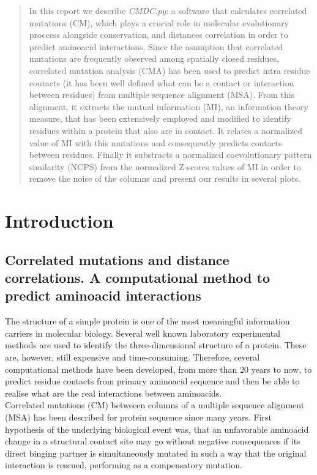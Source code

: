 \documentclass[12pt]{article}
\begin{document}
\maketitle

\begin{abstract}
In this report we describe \textit{CMDC.py}: a software that calculates correlated mutations (CM), which plays a crucial role in molecular evolutionary proccess alongside conservation, and distances correlation in order to predict aminoacid interactions. Since the asumption that correlated mutations are frequently observed among spatially closed residues, correlated mutation analysis (CMA) has been used to predict intra residue contacts (it has been well defined what can be a contact or interaction between residues) from multiple sequence alignment (MSA). From this alignment, it extracts the mutual information (MI), an information theory measure, that has been extensively employed and modified to identify residues within a protein that also are in contact. It relates a normalized value of MI with this mutations and consequently predicts contacts between residues. Finally it substracts a normalized coevolutionary pattern similarity (NCPS) from the normalized Z-scores values of MI in order to remove the noise of the columns and present our results in several plots.
\end{abstract}
\clearpage
\tableofcontents
\clearpage
\section{Introduction}
\subsection{Correlated mutations and distance correlations. A computational method to predict aminoacid interactions}
The structure of a simple protein is one of the most meaningful information carriers in molecular biology. Several well known laboratory experimental methods are used to identify the three-dimensional structure of a protein. These are, however, still expensive and time-consuming. Therefore, several computational methods have been developed, from more than 20 years to now, to predict residue contacts from primary aminoacid sequence and then be able to realise what are the real interactions between aminoacids.\\ 

Correlated mutations (CM) betweeen columns of a multiple sequence alignment (MSA) has been described for protein sequence since many years. First hypothesis of the underlying biological event was, that an unfavorable aminoacid change in a structural contact site may go without negative consequences if its direct binging partner is simultaneously mutated in such a way that the original interaction is rescued, performing as a compensatory mutation\cite{Kowarsch2010}. \\
\end{document}
